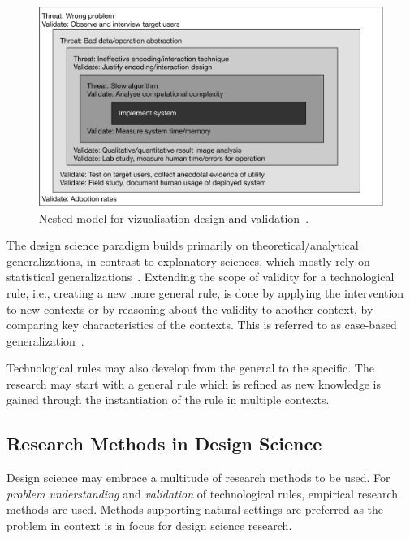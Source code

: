 \documentclass[graybox]{svmult}
\newcommand{\peggy}[1]{\textcolor{blue}{{\it [Peggy says: #1]}}}
\newcommand{\peggy}[1]{}
\begin{document}
\begin{figure}[t]
  \includegraphics[width=\textwidth]{Figures/nested_model.pdf}
\caption{Nested model for vizualisation design and validation~\cite{munzner2009}.}
\label{fig:nested_model}       %
\end{figure} 

The design science paradigm builds primarily on theoretical/analytical generalizations, in contrast to explanatory sciences, which mostly rely on statistical generalizations~\cite[p. 30]{Runeson12Case}. Extending the scope of validity for a technological rule, i.e., creating a new more general rule, is done by applying the intervention to new contexts or by reasoning about the validity to another context, by comparing key characteristics of the contexts. This is referred to as case-based generalization~\cite{wieringa_six_2015}.  

Technological rules may also develop from the general to the specific. The research may start with a general rule which is refined as new knowledge is gained through the instantiation of the rule in multiple contexts. 


\subsection{Research Methods in Design Science} 


Design science may embrace a multitude of research methods to be used. For \emph{problem understanding} and \emph{validation} of technological rules, empirical research methods are used. Methods supporting natural settings are preferred as the problem in context is in focus for design science research. 
\end{document}
